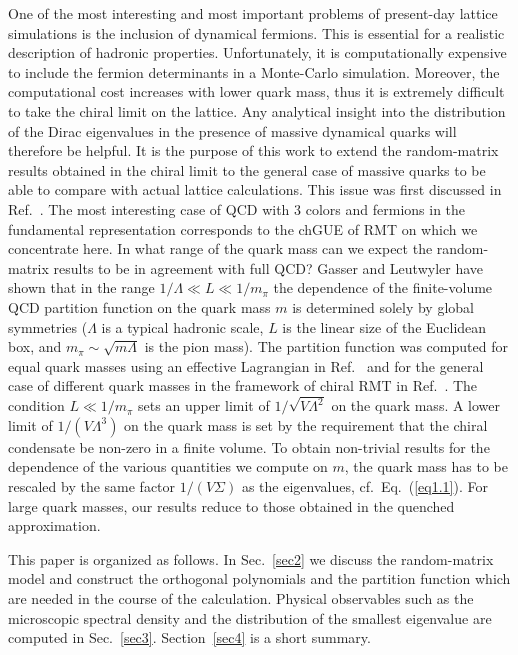 One of the most interesting and most important problems of present-day
lattice simulations is the inclusion of dynamical fermions.  This is
essential for a realistic description of hadronic properties.
Unfortunately, it is computationally expensive to include the fermion
determinants in a Monte-Carlo simulation.  Moreover, the computational
cost increases with lower quark mass, thus it is extremely difficult
to take the chiral limit on the lattice.  Any analytical insight into
the distribution of the Dirac eigenvalues in the presence of massive
dynamical quarks will therefore be helpful.  It is the purpose of this
work to extend the random-matrix results obtained in the chiral limit
to the general case of massive quarks to be able to compare with
actual lattice calculations.  This issue was first discussed in
Ref.~\cite{Jurk96}.  The most interesting case of QCD with 3 colors
and fermions in the fundamental representation corresponds to the
chGUE of RMT on which we concentrate here.  In what range of the quark
mass can we expect the random-matrix results to be in agreement with
full QCD?  Gasser and Leutwyler \cite{Gass87} have shown that in the
range $1/\Lambda\ll L\ll 1/m_\pi$ the dependence of the finite-volume
QCD partition function on the quark mass $m$ is determined solely by
global symmetries ($\Lambda$ is a typical hadronic scale, $L$ is the
linear size of the Euclidean box, and $m_\pi\sim\sqrt{m\Lambda}$ is
the pion mass).  The partition function was computed for equal quark
masses using an effective Lagrangian in Ref.~\cite{Leut92} and for the
general case of different quark masses in the framework of chiral RMT
in Ref.~\cite{Jack96c}.  The condition $L\ll 1/m_\pi$ sets an upper
limit of $1/\sqrt{V\Lambda^2}$ on the quark mass.  A lower limit of
$1/(V\Lambda^3)$ on the quark mass is set by the requirement that the
chiral condensate be non-zero in a finite volume.  To obtain
non-trivial results for the dependence of the various quantities we
compute on $m$, the quark mass has to be rescaled by the same factor
$1/(V\Sigma)$ as the eigenvalues, cf.~Eq.~(\ref{eq1.1}).  For large
quark masses, our results reduce to those obtained in the quenched
approximation.

This paper is organized as follows.  In Sec.~\ref{sec2} we discuss the
random-matrix model and construct the orthogonal polynomials and the
partition function which are needed in the course of the calculation.
Physical observables such as the microscopic spectral density and the
distribution of the smallest eigenvalue are computed in
Sec.~\ref{sec3}.  Section~\ref{sec4} is a short summary.

